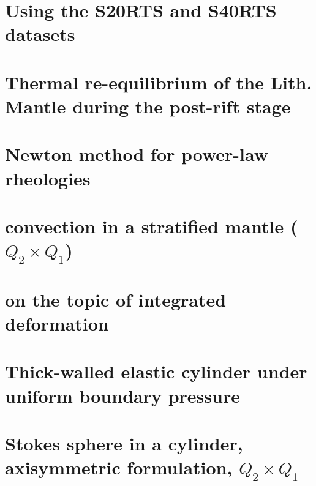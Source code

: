 \documentclass[a4paper,11pt]{report}
\begin{document}
\chapter{Using the S20RTS and S40RTS datasets \label{f85}} %

\chapter{Thermal re-equilibrium of the Lith. Mantle during the post-rift stage \label{f86}} %

\chapter{Newton method for power-law rheologies \label{f87}} %

\chapter{convection in a stratified mantle ($Q_2\times Q_1$) \label{f88}} %

\chapter{on the topic of integrated deformation	\label{f89}} %

\chapter{Thick-walled elastic cylinder under uniform boundary pressure \label{f90}} %

\chapter{Stokes sphere in a cylinder, axisymmetric formulation, $Q_2\times Q_1$ \label{f91}} %
\end{document}
